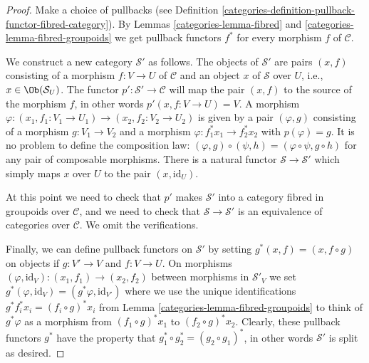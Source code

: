 \begin{proof}

Make a choice of pullbacks (see
Definition \ref{categories-definition-pullback-functor-fibred-category}).
By Lemmas \ref{categories-lemma-fibred} and \ref{categories-lemma-fibred-groupoids}
we get pullback functors $f^*$ for
every morphism $f$ of $\mathcal{C}$.

\medskip\noindent
We construct a new category $\mathcal{S}'$ as follows.
The objects of $\mathcal{S}'$ are pairs $(x, f)$
consisting of a morphism $f : V \to U$ of $\mathcal{C}$
and an object $x$ of $\mathcal{S}$ over $U$, i.e.,
$x\in \Ob(\mathcal{S}_U)$. The functor
$p' : \mathcal{S}' \to \mathcal{C}$ will map the pair $(x, f)$ to the source
of the morphism $f$, in other words $p'(x, f : V\to U) = V$. A morphism
$\varphi : (x_1, f_1: V_1 \to U_1) \to (x_2, f_2 : V_2 \to U_2)$ is given by a
pair $(\varphi, g)$ consisting of a morphism $g : V_1 \to V_2$ and a morphism
$\varphi : f_1^\ast x_1 \to f_2^\ast x_2$ with $p(\varphi) = g$. It is no
problem to define the composition law: $(\varphi, g) \circ (\psi, h) =
(\varphi \circ \psi, g\circ h)$ for any pair of composable morphisms.
There is a natural functor $\mathcal{S} \to \mathcal{S}'$ which simply maps
$x$ over $U$ to the pair $(x, \text{id}_U)$.

\medskip\noindent
At this point we need to check that $p'$ makes $\mathcal{S}'$ into a category
fibred in groupoids over $\mathcal{C}$, and we need to check that
$\mathcal{S} \to \mathcal{S}'$ is an equivalence of categories over
$\mathcal{C}$. We omit the verifications.

\medskip\noindent
Finally, we can define pullback functors on $\mathcal{S}'$
by setting $g^\ast(x, f) = (x, f \circ g)$ on objects if
$g : V' \to V$ and $f : V \to U$. On morphisms
$(\varphi, \text{id}_V) : (x_1, f_1) \to (x_2, f_2)$
between morphisms in $\mathcal{S}'_V$ we set $g^\ast(\varphi, \text{id}_V) =
(g^\ast\varphi, \text{id}_{V'})$ where we use the unique identifications
$g^\ast f_i^\ast x_i = (f_i \circ g)^\ast x_i$ from Lemma
\ref{categories-lemma-fibred-groupoids} to think of $g^\ast\varphi$ as a morphism from
$(f_1 \circ g)^\ast x_1$ to $(f_2 \circ g)^\ast x_2$. Clearly, these pullback
functors $g^\ast$ have the property that
$g_1^\ast \circ g_2^\ast = (g_2\circ g_1)^\ast$, in other words $\mathcal{S}'$
is split as desired.
\end{proof}


